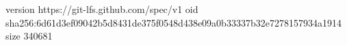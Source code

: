 version https://git-lfs.github.com/spec/v1
oid sha256:6d61d3ef09042b5d8431de375f0548d438e09a0b33337b32e7278157934a1914
size 340681
